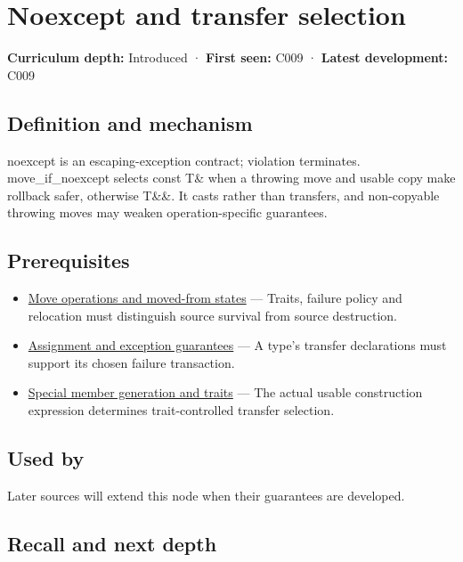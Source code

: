 \hypertarget{appendix-c746afaa47d1}{}\label{referencestart:appendix-c746afaa47d1}
\section{Noexcept and transfer selection}\label{appendix-c746afaa47d1-noexcept-and-transfer-selection}

\textbf{Curriculum depth:} Introduced · \textbf{First seen:} C009 · \textbf{Latest development:} C009

\subsection{Definition and mechanism}\label{appendix-c746afaa47d1-definition-and-mechanism}

noexcept is an escaping-exception contract; violation terminates. move\_if\_noexcept selects const T\& when a throwing move and usable copy make rollback safer, otherwise T\&\&. It casts rather than transfers, and non-copyable throwing moves may weaken operation-specific guarantees.

\subsection{Prerequisites}\label{appendix-c746afaa47d1-prerequisites}

\begin{itemize}
\tightlist
\item
  \hyperref[appendix-5636651017c2]{Move operations and moved-from states} --- Traits, failure policy and relocation must distinguish source survival from source destruction.
\item
  \hyperref[appendix-bea6beb5350f]{Assignment and exception guarantees} --- A type's transfer declarations must support its chosen failure transaction.
\item
  \hyperref[appendix-42e02a12c694]{Special member generation and traits} --- The actual usable construction expression determines trait-controlled transfer selection.
\end{itemize}

\subsection{Used by}\label{appendix-c746afaa47d1-used-by}

Later sources will extend this node when their guarantees are developed.

\subsection{Recall and next depth}\label{appendix-c746afaa47d1-recall-and-next-depth}

